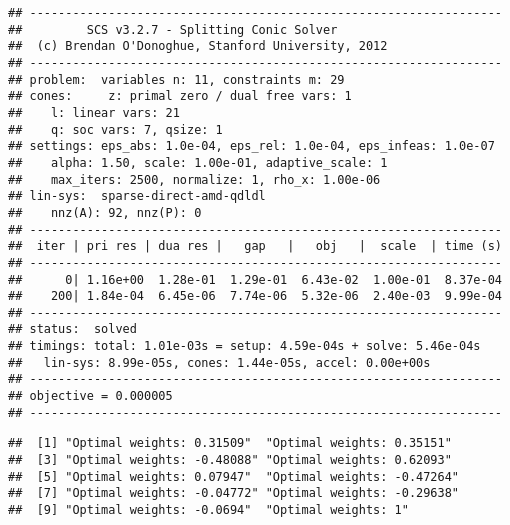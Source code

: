 \documentclass[
]{article}
\newenvironment{Shaded}{\begin{snugshade}}{\end{snugshade}}
\newcommand{\CommentTok}[1]{\textcolor[rgb]{0.56,0.35,0.01}{\textit{#1}}}
\newcommand{\DecValTok}[1]{\textcolor[rgb]{0.00,0.00,0.81}{#1}}
\newcommand{\FunctionTok}[1]{\textcolor[rgb]{0.13,0.29,0.53}{\textbf{#1}}}
\newcommand{\NormalTok}[1]{#1}
\newcommand{\SpecialCharTok}[1]{\textcolor[rgb]{0.81,0.36,0.00}{\textbf{#1}}}
\newcommand{\StringTok}[1]{\textcolor[rgb]{0.31,0.60,0.02}{#1}}
\begin{document}
\begin{verbatim}
## ------------------------------------------------------------------
##         SCS v3.2.7 - Splitting Conic Solver
##  (c) Brendan O'Donoghue, Stanford University, 2012
## ------------------------------------------------------------------
## problem:  variables n: 11, constraints m: 29
## cones:     z: primal zero / dual free vars: 1
##    l: linear vars: 21
##    q: soc vars: 7, qsize: 1
## settings: eps_abs: 1.0e-04, eps_rel: 1.0e-04, eps_infeas: 1.0e-07
##    alpha: 1.50, scale: 1.00e-01, adaptive_scale: 1
##    max_iters: 2500, normalize: 1, rho_x: 1.00e-06
## lin-sys:  sparse-direct-amd-qdldl
##    nnz(A): 92, nnz(P): 0
## ------------------------------------------------------------------
##  iter | pri res | dua res |   gap   |   obj   |  scale  | time (s)
## ------------------------------------------------------------------
##      0| 1.16e+00  1.28e-01  1.29e-01  6.43e-02  1.00e-01  8.37e-04 
##    200| 1.84e-04  6.45e-06  7.74e-06  5.32e-06  2.40e-03  9.99e-04 
## ------------------------------------------------------------------
## status:  solved
## timings: total: 1.01e-03s = setup: 4.59e-04s + solve: 5.46e-04s
##   lin-sys: 8.99e-05s, cones: 1.44e-05s, accel: 0.00e+00s
## ------------------------------------------------------------------
## objective = 0.000005
## ------------------------------------------------------------------
\end{verbatim}

\begin{Shaded}
\end{Shaded}

\begin{verbatim}
##  [1] "Optimal weights: 0.31509"  "Optimal weights: 0.35151" 
##  [3] "Optimal weights: -0.48088" "Optimal weights: 0.62093" 
##  [5] "Optimal weights: 0.07947"  "Optimal weights: -0.47264"
##  [7] "Optimal weights: -0.04772" "Optimal weights: -0.29638"
##  [9] "Optimal weights: -0.0694"  "Optimal weights: 1"
\end{verbatim}

\begin{Shaded}
\end{Shaded}
\end{document}
